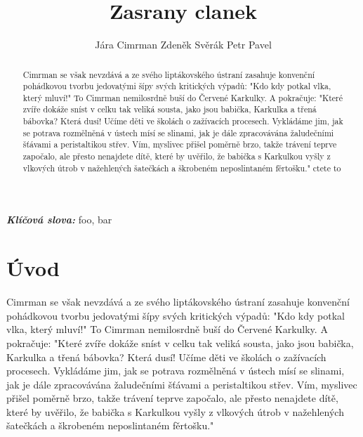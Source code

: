 \documentclass{cygclanek}
\begin{document}
\title{Zasrany clanek}

\author{Jára Cimrman Zdeněk Svěrák Petr Pavel}


\providecommand{\keywords}[1]{\textbf{\textit{Klíčová slova:}} #1}
\newcommand{\email}{cimrman\at vut.cz}

\maketitle
\begin{abstract}
	
	Cimrman se však nevzdává a ze svého liptákovského ústraní zasahuje konvenční pohádkovou tvorbu jedovatými šípy svých kritických výpadů: "Kdo kdy potkal vlka, který mluví!" To Cimrman nemilosrdně buší do Červené Karkulky. A pokračuje: "Které zvíře dokáže sníst v celku tak veliká sousta, jako jsou babička, Karkulka a třená bábovka? Která dusí! Učíme děti ve školách o zažívacích procesech. Vykládáme jim, jak se potrava rozmělněná v ústech mísí se slinami, jak je dále zpracovávána žaludečními šťávami a peristaltikou střev. Vím, myslivec přišel poměrně brzo, takže trávení teprve započalo, ale přesto nenajdete dítě, které by uvěřilo, že babička s Karkulkou vyšly z vlkových útrob v nažehlených šatečkách a škrobeném neposlintaném fěrtošku."
	ctete to
\end{abstract}
\keywords{foo, bar}

\section{Úvod}
Cimrman \cite{pelikan} se \at však nevzdává a ze svého liptákovského ústraní zasahuje konvenční pohádkovou tvorbu jedovatými šípy svých kritických výpadů: "Kdo kdy potkal vlka, který mluví!" To Cimrman nemilosrdně buší do Červené Karkulky. A pokračuje: "Které zvíře dokáže sníst v celku tak veliká sousta, jako jsou babička, Karkulka a třená bábovka? Která dusí! Učíme děti ve školách o zažívacích procesech. Vykládáme jim, jak se potrava rozmělněná v ústech mísí se slinami, jak je dále zpracovávána žaludečními šťávami a peristaltikou střev. Vím, myslivec přišel poměrně brzo, takže trávení teprve započalo, ale přesto nenajdete dítě, které by uvěřilo, že babička s Karkulkou vyšly z vlkových útrob v nažehlených šatečkách a škrobeném neposlintaném fěrtošku."
\end{document}
